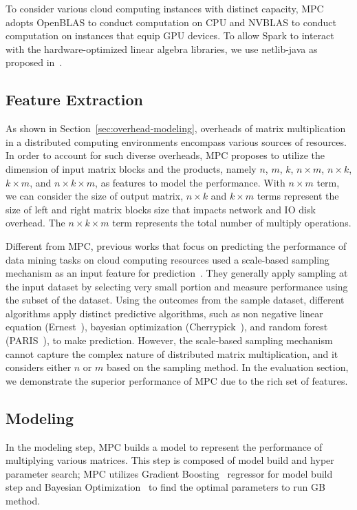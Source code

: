 \documentclass[10pt, conference, compsocconf]{IEEEtran}
\begin{document}
To consider various cloud computing instances with distinct capacity, MPC adopts OpenBLAS to conduct computation on CPU and NVBLAS to conduct computation on instances that equip GPU devices. To allow Spark to interact with the hardware-optimized linear algebra libraries, we use netlib-java as proposed in~\cite{fatman-littleboy}.

\subsection{Feature Extraction}\label{sec:features}
As shown in Section~\ref{sec:overhead-modeling}, overheads of matrix multiplication in a distributed computing environments encompass various sources of resources. In order to account for such diverse overheads, MPC proposes to utilize the dimension of input matrix blocks and the products, namely $n$, $m$, $k$, $n \times m$, $n \times k$, $k \times m$, and $n \times k \times m$, as features to model the performance. With $n \times m$ term, we can consider the size of output matrix, $n \times k$ and $k \times m$ terms represent the size of left and right matrix blocks size that impacts network and IO disk overhead. The $n \times k \times m$ term represents the total number of multiply operations.

Different from MPC, previous works that focus on predicting the performance of data mining tasks on cloud computing resources used a scale-based sampling mechanism as an input feature for prediction~\cite{ernest, cherrypick, paris}. They generally apply sampling at the input dataset by selecting very small portion and measure performance using the subset of the dataset. Using the outcomes from the sample dataset, different algorithms apply distinct predictive algorithms, such as non negative linear equation (Ernest~\cite{ernest}), bayesian optimization (Cherrypick~\cite{cherrypick}), and random forest (PARIS~\cite{paris}), to make prediction. However, the scale-based sampling mechanism cannot capture the complex nature of distributed matrix multiplication, and it considers either $n$ or $m$ based on the sampling method. In the evaluation section, we demonstrate the superior performance of MPC due to the rich set of features.

\subsection{Modeling}\label{sec:modeling}
In the modeling step, MPC builds a model to represent the performance of multiplying various matrices. This step is composed of model build and hyper parameter search; MPC utilizes Gradient Boosting~\cite{gradient-boosting} regressor for model build step and Bayesian Optimization~\cite{bayesian-optimization} to find the optimal parameters to run GB method.
\end{document}
